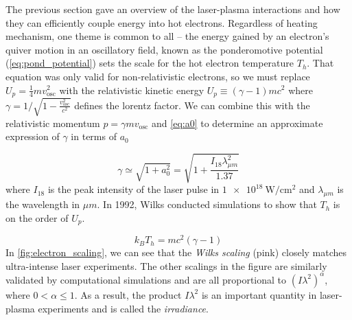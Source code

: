 The previous section gave an overview of the laser-plasma interactions and how they can efficiently couple energy into hot electrons. Regardless of heating mechanism, one theme is common to all -- the energy gained by an electron's quiver motion in an oscillatory field, known as the ponderomotive potential (\cref{eq:pond_potential}) sets the scale for the hot electron temperature $T_h$. That equation was only valid for non-relativistic electrons, so we must replace $U_p = \frac{1}{4} m v_\text{osc}^2$ with the relativistic kinetic energy $U_p \equiv (\gamma - 1) m c^2$ where $\gamma = 1 / \sqrt{1 - \frac{v_\text{osc}^2}{c^2}}$ defines the lorentz factor. We can combine this with the relativistic momentum $p = \gamma m v_\text{osc}$ and \cref{eq:a0} to determine an approximate expression of $\gamma$ in terms of $a_0$
	
\begin{equation}
	\gamma \simeq \sqrt{1 + a_0^2} = \sqrt{1 + \frac{I_{18} \lambda_{\mu m}^2}{1.37}} \label{eq:gamma}
\end{equation}
where $I_{18}$ is the peak intensity of the laser pulse in $\SI{1e18}{\watt \per \centi \meter \squared}$ and $\lambda_{\mu m}$ is the wavelength in $\mu m$. In 1992, Wilks\cite{Wilks_1992_PRL} conducted simulations to show that $T_h$ is on the order of $U_p$. 

\begin{equation}
	k_B T_h = m c^2 (\gamma - 1) \label{eq:wilks}
\end{equation}
In \cref{fig:electron_scaling}, we can see that the \emph{Wilks scaling} (pink) closely matches ultra-intense laser experiments. The other scalings in the figure are similarly validated by computational simulations and are all proportional to $(I \lambda^2)^\alpha$, where $0 < \alpha \leq 1$. As a result, the product $I \lambda^2$ is an important quantity in laser-plasma experiments and is called the \emph{irradiance}.

